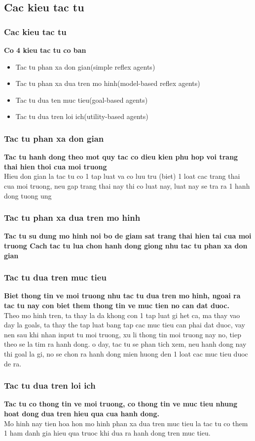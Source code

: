 \documentclass[12pt]{beamer}
\begin{document}
\subsection{Cac kieu tac tu}
\begin{frame}
\frametitle{Cac kieu tac tu}

\textbf{ Co 4 kieu tac tu co ban}
\begin{itemize}
\item Tac tu phan xa don gian(simple reflex agents)
\item Tac tu phan xa dua tren mo hinh(model-based reflex agents)
\item Tac tu dua ten muc tieu(goal-based agents)
\item Tac tu dua tren loi ich(utility-based agents)
\end{itemize}

\end{frame}
\begin{frame}
\frametitle{Tac tu phan xa don gian}
\textbf{Tac tu hanh dong theo mot quy tac co dieu kien phu hop voi trang thai hien thoi cua moi truong} \\
Hieu don gian la tac tu co 1 tap luat va co luu tru (biet) 1 loat cac trang thai cua moi truong, neu gap trang thai nay thi co luat nay, luat nay se tra ra 1 hanh dong tuong ung \\
\end{frame}
\begin{frame}
\frametitle{Tac tu phan xa dua tren mo hinh}
\textbf{Tac tu su dung mo hinh noi bo de giam sat trang thai hien tai cua moi truong Cach tac tu lua chon hanh dong giong nhu tac tu phan xa don gian} \\
\end{frame}
\begin{frame}
\frametitle{Tac tu dua tren muc tieu}
 \textbf{Biet thong tin ve moi truong nhu tac tu dua tren mo hinh, ngoai ra tac tu nay con biet them thong tin ve muc tien no can dat duoc.}\\
 Theo mo hinh tren, ta thay la da khong con 1 tap luat gi het ca, ma thay vao day la goals, ta thay the tap luat bang tap cac muc tieu can phai dat duoc, vay nen sau khi nhan input tu moi truong, xu li thong tin moi truong nay no, tiep theo se la tim ra hanh dong. o day, tac tu se phan tich xem, neu hanh dong nay thi goal la gi, no se chon ra hanh dong mien huong den 1 loat cac muc tieu duoc de ra.

\end{frame}
\begin{frame}
\frametitle{Tac tu dua tren loi ich}
 \textbf{Tac tu co thong tin ve moi truong, co thong tin ve muc tieu nhung hoat dong dua tren hieu qua cua hanh dong.}\\
 Mo hinh nay tien hoa hon mo hinh phan xa dua tren muc tieu la tac tu co them 1 ham danh gia hieu qua truoc khi dua ra hanh dong tren muc tieu.
\end{frame}
\end{document}
